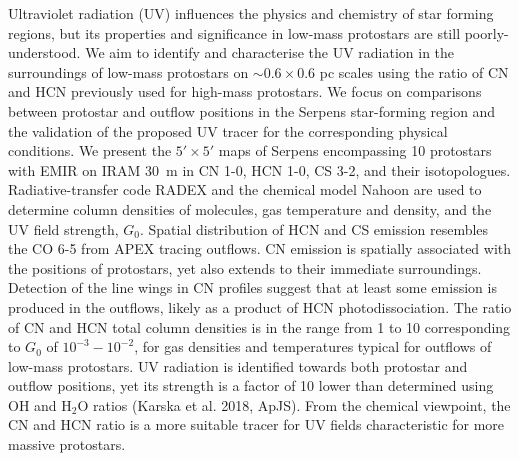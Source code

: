 \documentclass{aa}
\begin{document}
	
% 
  \abstract
   {Ultraviolet radiation (UV) influences the physics and chemistry of star forming regions,
   but its properties and significance in low-mass protostars are still poorly-understood.} 
   {We aim to identify and characterise the UV radiation in the surroundings of low-mass
   protostars on $\sim 0.6\times0.6$ pc scales
   using the ratio of CN and HCN previously used for high-mass protostars.
    We focus on comparisons between protostar and outflow positions in the Serpens star-forming 
    region and the validation of the proposed UV tracer for the corresponding physical 
    conditions.}
   {We present the $5'\times5'$ maps of Serpens encompassing 10 protostars with EMIR on IRAM 30~m 
   in CN 1-0, HCN 1-0, CS 3-2, and their isotopologues. Radiative-transfer code RADEX and 
   the chemical model Nahoon are used to determine column densities of molecules, gas temperature and density,
   and the UV field strength, $G_\mathrm{0}$.}
   {Spatial distribution of HCN and CS emission resembles the CO 6-5 from APEX tracing 
   outflows. CN emission is spatially associated with the positions of protostars, yet also 
   extends to their immediate surroundings. Detection of the line wings in CN profiles 
   suggest that at least some emission is produced in the outflows, likely as a product 
   of HCN photodissociation. The ratio of CN and HCN total column densities is in the range from 
   1 to 10 corresponding to $G_\mathrm{0}$ of $10^{-3}-10^{-2}$, for gas densities and 
   temperatures typical for outflows of low-mass protostars.}
   {UV radiation is identified towards both protostar and outflow positions,
    yet its strength is a factor of 10 lower than determined using OH and H$_2$O ratios 
    (Karska et al. 2018, ApJS). From the chemical viewpoint, the CN and HCN ratio 
    is a more suitable tracer for UV fields characteristic for more massive protostars.}
   

   \maketitle
%
%
\end{document}
